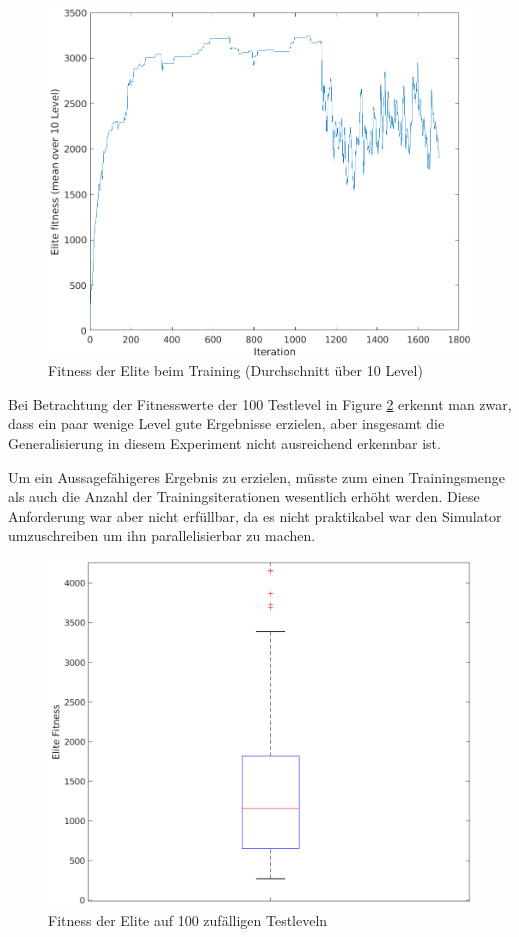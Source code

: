 \documentclass{hbrs-ecta-report}
\begin{document}
\begin{figure}[h!]
	\centering
	\includegraphics[width=\linewidth]{img/multilevelTrainFitness.png}
	\caption{Fitness der Elite beim Training (Durchschnitt über 10 Level)}
	\label{fig:MultilevelTrain} 
\end{figure}

Bei Betrachtung der Fitnesswerte der 100 Testlevel in Figure \ref{fig:multilevelTest} erkennt man zwar, dass ein paar wenige Level gute Ergebnisse erzielen, aber insgesamt die Generalisierung in diesem Experiment nicht ausreichend erkennbar ist. \newline

Um ein Aussagefähigeres Ergebnis zu erzielen, müsste zum einen Trainingsmenge als auch die Anzahl der Trainingsiterationen wesentlich erhöht werden. Diese Anforderung war aber nicht erfüllbar, da es nicht praktikabel war den Simulator umzuschreiben um ihn parallelisierbar zu machen. 

\begin{figure}[h!]
	\centering
	\includegraphics[width=\linewidth]{img/multilevelTestFitness.png}
	\caption{Fitness der Elite auf 100 zufälligen Testleveln}
	\label{fig:multilevelTest} 
\end{figure}
\end{document}
